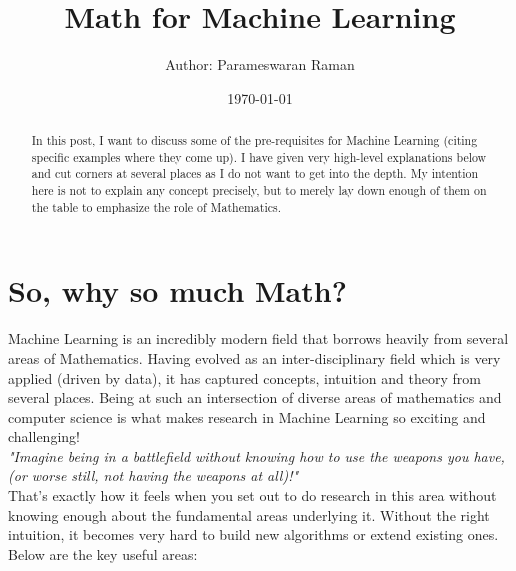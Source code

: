 \documentclass[a4paper]{article}
\title{Math for Machine Learning}
\author{Author: Parameswaran Raman}
\date{\today}
\begin{document}

\maketitle

\begin{abstract}
\noindent In this post, I want to discuss some of the pre-requisites for Machine Learning (citing specific examples where they come up). I have given very high-level explanations below and cut corners at several places as I do not want to get into the depth. My intention here is not to explain any concept precisely, but to merely lay down enough of them on the table to emphasize the role of Mathematics.
\end{abstract}

\section{So, why so much Math?}

\noindent Machine Learning is an incredibly modern field that borrows heavily from several areas of Mathematics. Having evolved as an inter-disciplinary field which is very applied (driven by data), it has captured concepts, intuition and theory from several places. Being at such an intersection of diverse areas of mathematics and computer science is what makes research in Machine Learning so exciting and challenging! \\

\noindent \textit{"Imagine being in a battlefield without knowing how to use the weapons you have, (or worse still, not having the weapons at all)!"} \\

\noindent That's exactly how it feels when you set out to do research in this area without knowing enough about the fundamental areas underlying it. Without the right intuition, it becomes very hard to build new algorithms or extend existing ones.\\

\noindent Below are the key useful areas:
\end{document}
